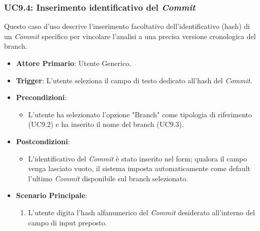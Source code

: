 \documentclass[12pt, a4paper]{article}
\begin{document}
\subsubsection{UC9.4: Inserimento identificativo del \textit{Commit}}\label{uc:9.4}
Questo caso d'uso descrive l'inserimento facoltativo dell'identificativo (hash) di un \textit{Commit} specifico per vincolare l'analisi a una precisa versione cronologica del branch.
\begin{itemize}
    \item \textbf{Attore Primario}: Utente Generico.
    \item \textbf{Trigger}: L'utente seleziona il campo di testo dedicato all'hash del \textit{Commit}.
    \item \textbf{Precondizioni}:\begin{itemize}\item L'utente ha selezionato l'opzione "Branch" come tipologia di riferimento (UC9.2) e ha inserito il nome del branch (UC9.3).\end{itemize}
    \item \textbf{Postcondizioni}:\begin{itemize}\item L'identificativo del \textit{Commit} è stato inserito nel form; qualora il campo venga lasciato vuoto, il sistema imposta automaticamente come default l'ultimo \textit{Commit} disponibile sul branch selezionato.\end{itemize}
    \item \textbf{Scenario Principale}:
    \begin{enumerate}
        \item L'utente digita l'hash alfanumerico del \textit{Commit} desiderato all'interno del campo di input preposto.
    \end{enumerate}
\end{itemize}
\end{document}
